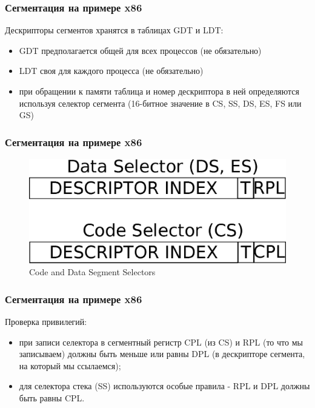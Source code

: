 \begin{frame}
\frametitle{Сегментация на примере x86}

Дескрипторы сегментов хранятся в таблицах GDT и LDT:
\begin{itemize}
  \item GDT предполагается общей для всех процессов (не обязательно)
  \item LDT своя для каждого процесса (не обязательно)
  \item при обращении к памяти таблица и номер дескриптора в ней определяются используя селектор сегмента (16-битное значение в CS, SS, DS, ES, FS или GS)
\end{itemize}
\end{frame}

\begin{frame}
\frametitle{Сегментация на примере x86}

\begin{figure}
  \centering\includegraphics[width=.9\linewidth]{arch-segs}
  \caption{Code and Data Segment Selectors}
\end{figure}

\end{frame}

\begin{frame}
\frametitle{Сегментация на примере x86}

Проверка привилегий:
\begin{itemize}
  \item при записи селектора в сегментный регистр CPL (из CS) и RPL (то что мы записываем) должны быть меньше или равны DPL (в дескрипторе сегмента, на который мы ссылаемся);
  \item для селектора стека (SS) используются особые правила - RPL и DPL должны быть равны CPL.
\end{itemize}
\end{frame}

